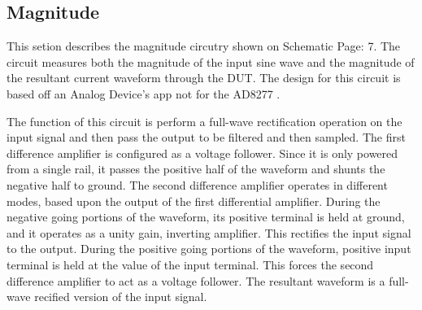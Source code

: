 \subsection{Magnitude}

This setion describes the magnitude circutry shown on Schematic Page: 7. The circuit measures both the magnitude of the input sine wave and the magnitude of the resultant current waveform through the DUT. The design for this circuit is based off an Analog Device's app not for the AD8277 \cite{absCircuit}.

The function of this circuit is perform a full-wave rectification operation on the input signal and then pass the output to be filtered and then sampled. The first difference amplifier is configured as a voltage follower. Since it is only powered from a single rail, it passes the positive half of the waveform and shunts the negative half to ground. The second difference amplifier operates in different modes, based upon the output of the first differential amplifier. During the negative going portions of the waveform, its positive terminal is held at ground, and it operates as a unity gain, inverting amplifier. This rectifies the input signal to the output. During the positive going portions of the waveform, positive input terminal is held at the value of the input terminal. This forces the second difference amplifier to act as a voltage follower. The resultant waveform is a full-wave recified version of the input signal.

